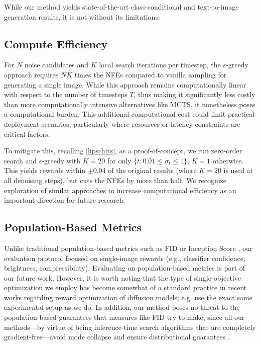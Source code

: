 \documentclass{article}
\begin{document}
While our method yields state-of-the-art class-conditional and text-to-image generation results, it is not without its limitations:

\subsection{Compute Efficiency} 

For $N$ noise candidates and $K$ local search iterations per timestep, the $\epsilon$-greedy approach requires $NK$ times the NFEs compared to vanilla sampling for generating a single image. While this approach remains computationally linear with respect to the number of timesteps $T$, thus making it significantly less costly than more computationally intensive alternatives like MCTS, it nonetheless poses a computational burden. This additional computational cost could limit practical deployment scenarios, particularly where resources or latency constraints are critical factors.

To mitigate this, recalling \autoref{lipschitz}, as a proof-of-concept, we run zero-order search and $\epsilon$-greedy with $K=20$ for only $\{t: 0.01 \leq \sigma_t \leq 1\}$, $K=1$ otherwise. This yields rewards within $\pm 0.04$ of the original results (where $K=20$ is used at all denoising steps), but cuts the NFEs by more than half. We recognize exploration of similar approaches to increase computational efficiency as an important direction for future research.

\subsection{Population-Based Metrics} 

Unlike traditional population-based metrics such as FID or Inception Score \citep{salimans2016improvedtechniquestraininggans}, our evaluation protocol focused on single-image rewards (e.g., classifier confidence, brightness, compressibility). Evaluating on population-based metrics is part of our future work. However, it is worth noting that the type of single-objective optimization we employ has become somewhat of a standard practice in recent works regarding reward optimization of diffusion models; e.g. \citet{yeh2025trainingfreediffusionmodelalignment, black2024trainingdiffusionmodelsreinforcement} use the exact same experimental setup as we do. In addition, our method poses no threat to the population-based guarantees that measures like FID try to make, since all our methods---by virtue of being inference-time search algorithms that are completely gradient-free---avoid mode collapse and ensure distributional guarantees \citep{yeh2025trainingfreediffusionmodelalignment}.
\end{document}
